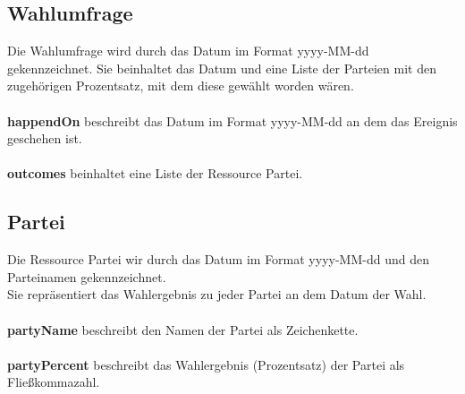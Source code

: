 \documentclass[a4paper,10pt,parskip]{article}
\begin{document}
\subsection{Wahlumfrage}
Die Wahlumfrage wird durch das Datum im Format yyyy-MM-dd gekennzeichnet. Sie beinhaltet das Datum und eine Liste der Parteien mit den zugehörigen Prozentsatz, mit dem diese gewählt worden wären.\\
\\
\textbf{happendOn} beschreibt das Datum im Format yyyy-MM-dd an dem das Ereignis geschehen ist.\\
\\
\textbf{outcomes} beinhaltet eine Liste der Ressource Partei.
\\
\subsection{Partei}
Die Ressource Partei wir durch das Datum im Format yyyy-MM-dd und den Parteinamen gekennzeichnet.\\
Sie repräsentiert das Wahlergebnis zu jeder Partei an dem Datum der Wahl.\\
\\
\textbf{partyName} beschreibt den Namen der Partei als Zeichenkette.\\
\\
\textbf{partyPercent} beschreibt das Wahlergebnis (Prozentsatz) der Partei als Fließkommazahl.\\
\\
\end{document}
